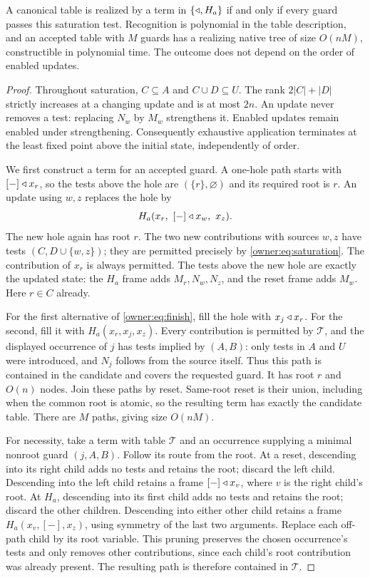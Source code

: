 \begin{theorem}\label{owner:thm:synthesis}
A canonical table is realized by a term in $\{\mathbin{\triangleleft},H_a\}$ if and only
if every guard passes this saturation test. Recognition is polynomial
in the table description, and an accepted table with $M$ guards has
a realizing native tree of size $O(nM)$, constructible in polynomial
time. The outcome does not depend on the order of enabled updates.
\end{theorem}
\begin{proof}
Throughout saturation, $C\subseteq A$ and $C\cup D\subseteq U$.
The rank $2|C|+|D|$ strictly increases at a changing update and is at
most $2n$. An update never removes a test: replacing $N_w$ by $M_w$
strengthens it. Enabled updates remain enabled under strengthening.
Consequently exhaustive application terminates at the least fixed point
above the initial state, independently of order.

We first construct a term for an accepted guard. A one-hole path starts
with $[-]\mathbin{\triangleleft} x_r$, so the tests above the hole are
$(\{r\},\varnothing)$ and its required root is $r$.
An update using $w,z$ replaces the hole by
\[
 H_a(x_r,\ [-]\mathbin{\triangleleft} x_w,\ x_z).
\]
The new hole again has root $r$. The two new contributions with sources
$w,z$ have tests $(C,D\cup\{w,z\})$; they are permitted precisely
by \eqref{owner:eq:saturation}. The contribution of $x_r$ is always
permitted. The tests above the new hole are exactly the updated state:
the $H_a$ frame adds $M_r,N_w,N_z$, and the reset frame adds $M_w$.
Here $r\in C$ already.

For the first alternative of \eqref{owner:eq:finish}, fill the hole with
$x_j\mathbin{\triangleleft} x_r$. For the second, fill it with $H_a(x_r,x_j,x_z)$.
Every contribution is permitted by $\mathcal T$, and the displayed
occurrence of $j$ has tests implied by $(A,B)$: only tests in $A$ and
$U$ were introduced, and $N_j$ follows from the source itself.
Thus this path is contained in the candidate and covers the requested
guard. It has root $r$ and $O(n)$ nodes. Join these paths by reset.
Same-root reset is their union, including when the common root is
atomic, so the resulting term has exactly the candidate table.
There are $M$ paths, giving size $O(nM)$.

For necessity, take a term with table $\mathcal T$ and an occurrence
supplying a minimal nonroot guard $(j,A,B)$. Follow its route from the
root. At a reset, descending into its right child adds no tests and
retains the root; discard the left child. Descending into the left child
retains a frame $[-]\mathbin{\triangleleft} x_v$, where $v$ is the right child's root.
At $H_a$, descending into its first child adds no tests and retains the
root; discard the other children. Descending into either other child
retains a frame $H_a(x_v,[-],x_z)$, using symmetry of the last two
arguments. Replace each off-path child by its root variable.
This pruning preserves the chosen occurrence's tests and only removes
other contributions, since each child's root contribution was already
present. The resulting path is therefore contained in $\mathcal T$.


\end{proof}
